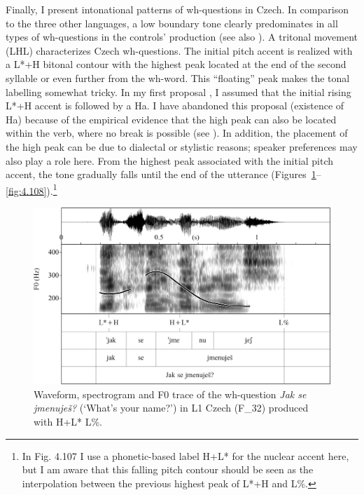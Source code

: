 \begin{sloppypar}
Finally, I present intonational patterns of wh-questions in Czech. In comparison to the three other languages, a low boundary tone clearly predominates in all types of wh-questions in the controls’ production (see also \citealt{Daneš1949, PeškováForthcoming}). A tritonal movement (LHL) characterizes Czech wh-questions. The initial pitch accent is realized with a L*+H bitonal contour with the highest peak located at the end of the second syllable or even further from the wh-word. This “floating” peak makes the tonal labelling somewhat tricky. In my first proposal \citep{Pešková2017}, I assumed that the initial rising L*+H accent is followed by a Ha. I have abandoned this proposal (existence of Ha) because of the empirical evidence that the high peak can also be located within the verb, where no break is possible (see \citealt{PeškováForthcoming}). In addition, the placement of the high peak can be due to dialectal or stylistic reasons; speaker preferences may also play a role here. From the highest peak associated with the initial pitch accent, the tone gradually falls until the end of the utterance (Figures~\ref{fig:4.107}--\ref{fig:4.108}).{\footnote{In Fig. 4.107 I use a phonetic-based label H+L* for the nuclear accent here, but I am aware that this falling pitch contour should be seen as the interpolation between the previous highest peak of L*+H and L\%.}}
\end{sloppypar}


\begin{figure}


\includegraphics[width=\textwidth]{figures/Figure_4.107.png}



\caption{Waveform, spectrogram and F0 trace of the wh-question \textit{Jak se jmenuješ?} (‘What’s your name?’) in L1 Czech (F\_32) produced with H+L* L\%.}
\label{fig:4.107}
\end{figure}

